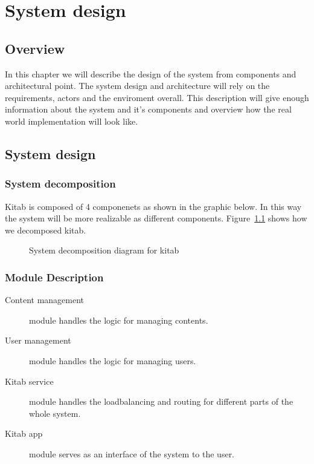 \chapter{System design}
\section{Overview}

In this chapter we will describe the design of the system from components and architectural point. The system design and architecture will rely on the requirements, actors and the enviroment overall. This description will give enough information about the system and it's components and overview how the real world implementation will look like.

\section{System design}
	\subsection{System decomposition}

Kitab is composed of 4 componenets as shown in the graphic below. In this way the system will be more realizable as different components. Figure~\ref{dia_sys_decomposition} shows how we decomposed kitab.

	\begin{figure}[H]
	\begin{center}

	\caption{System decomposition diagram for kitab}
	\label{dia_sys_decomposition}

	\end{center}
	\end{figure}

	\subsection{Module Description}

	\begin{description}
		\item[Content management] module handles the logic for managing contents. 
		\item[User management] module handles the logic for managing users.
		\item[Kitab service] module handles the loadbalancing and routing for different parts of the whole system.
		\item[Kitab app] module serves as an interface of the system to the user.
	\end{description}

